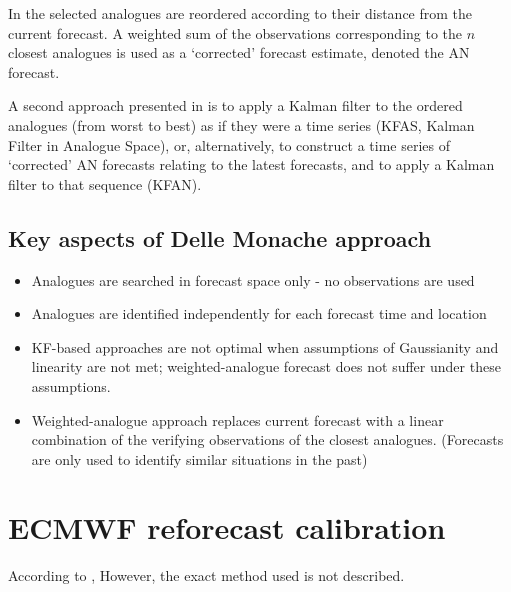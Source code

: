 \documentclass[10pt,fleqn]{article}
\begin{document}
In \cite{Djalalova2015} the selected analogues are reordered according to their distance from the current forecast. A weighted sum of the observations corresponding to the $n$ closest analogues is used as a `corrected' forecast estimate, denoted the AN forecast.

A second approach presented in \cite{Djalalova2015} is to apply a Kalman filter to the ordered analogues (from worst to best) as if they were a time series (KFAS, Kalman Filter in Analogue Space), or, alternatively, to construct a time series of `corrected' AN forecasts relating to the latest forecasts, and to apply a Kalman filter to that sequence (KFAN).

\subsection{Key aspects of Delle Monache approach}

\begin{itemize}

\item Analogues are searched in forecast space only - no observations are used

\item Analogues are identified independently for each forecast time and location

\item KF-based approaches are not optimal when assumptions of Gaussianity and linearity are not met; weighted-analogue forecast does not suffer under these assumptions.

\item Weighted-analogue approach replaces current forecast with a linear combination of the verifying observations of the closest analogues. (Forecasts are only used to identify similar situations in the past)

\end{itemize}

\section{ECMWF reforecast calibration}

According to \cite{ECMWFReforecasts},  However, the exact method used is not described.
\end{document}
